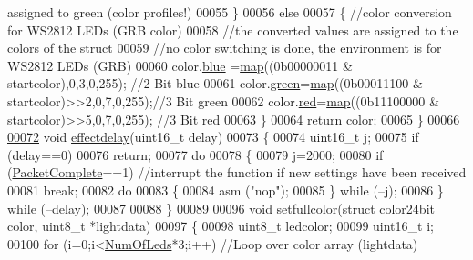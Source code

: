 \begin{DoxyCode}
{       assigned to green (color profiles!) }
00055     \}
00056     \textcolor{keywordflow}{else}
00057     \{   \textcolor{comment}{//color conversion for WS2812 LEDs (GRB color)}
00058         \textcolor{comment}{//the converted values are assigned to the colors of the struct}
00059         \textcolor{comment}{//no color switching is done, the environment is for WS2812 LEDs (GRB)}
00060         color.\hyperlink{structcolor24bit_a287b397e90d7b995c81ff54e741f96b2}{blue} =\hyperlink{_led_effects_8c_ad67a4e660b5122ed454e101432bbdba0}{map}((0b00000011 & startcolor),0,3,0,255);    \textcolor{comment}{//2 Bit blue}
00061         color.\hyperlink{structcolor24bit_a90d21fa503b626c00cdc8d94863d5877}{green}=\hyperlink{_led_effects_8c_ad67a4e660b5122ed454e101432bbdba0}{map}((0b00011100 & startcolor)>>2,0,7,0,255);\textcolor{comment}{//3 Bit green}
00062         color.\hyperlink{structcolor24bit_ad47d918910aaa51c73160ac85999d09c}{red}=\hyperlink{_led_effects_8c_ad67a4e660b5122ed454e101432bbdba0}{map}((0b11100000 & startcolor)>>5,0,7,0,255);    \textcolor{comment}{//3 Bit red}
00063     \}
00064     \textcolor{keywordflow}{return} color;
00065 \}
00066 
\hypertarget{_led_effects_8c_source_l00072}{}\hyperlink{_led_effects_8h_a6950e7657ba74d0d490ba36427533c4b}{00072} \textcolor{keywordtype}{void} \hyperlink{_led_effects_8c_a6950e7657ba74d0d490ba36427533c4b}{effectdelay}(uint16\_t delay)
00073 \{
00074     uint16\_t j;
00075     \textcolor{keywordflow}{if} (delay==0)
00076         \textcolor{keywordflow}{return};
00077     \textcolor{keywordflow}{do}
00078     \{
00079         j=2000;
00080         \textcolor{keywordflow}{if} (\hyperlink{globals_8h_a1b09d1a5bcf4c8ab435bb3c9e36def59}{PacketComplete}==1)    \textcolor{comment}{//interrupt the function if new settings have been received}
00081             \textcolor{keywordflow}{break};
00082         \textcolor{keywordflow}{do}
00083         \{
00084             \textcolor{keyword}{asm} (\textcolor{stringliteral}{"nop"});
00085         \} \textcolor{keywordflow}{while} (--j);
00086     \} \textcolor{keywordflow}{while} (--delay);
00087     
00088 \}
00089 
\hypertarget{_led_effects_8c_source_l00096}{}\hyperlink{_led_effects_8h_a2d54d1a6c61fe667b7c68ff04a11c503}{00096} \textcolor{keywordtype}{void} \hyperlink{_led_effects_8c_a2d54d1a6c61fe667b7c68ff04a11c503}{setfullcolor}(\textcolor{keyword}{struct} \hyperlink{structcolor24bit}{color24bit} color, uint8\_t *lightdata)
00097 \{
00098     uint8\_t ledcolor;
00099     uint16\_t i;
00100     \textcolor{keywordflow}{for} (i=0;i<\hyperlink{globals_8h_ad5db4045aed262ed4aae2af9d81fab98}{NumOfLeds}*3;i++)    \textcolor{comment}{//Loop over color array (lightdata)}

\end{DoxyCode}
